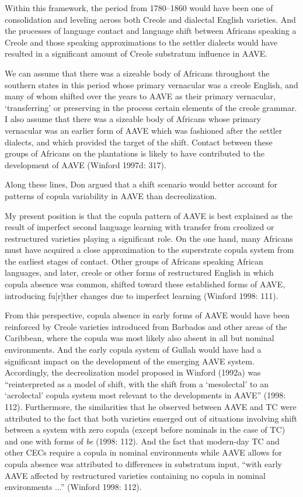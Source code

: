 \documentclass[output=paper, colorlinks,citecolor=brown]{langscibook}
\begin{document}
Within this framework, the period from 1780--1860 would have been one of consolidation and leveling across both Creole and dialectal English varieties. And the processes of language contact and language shift between Africans speaking a Creole and those speaking approximations to the settler dialects would have resulted in a significant amount of Creole substratum influence in AAVE. 

We can assume that there was a sizeable body of Africans throughout the southern states in this period whose primary vernacular was a creole English, and many of whom shifted over the years to AAVE as their primary vernacular, ‘transferring' or preserving in the process certain elements of the creole grammar. I also assume that there was a sizeable body of Africans whose primary vernacular was an earlier form of AAVE which was fashioned after the settler dialects, and which provided the target of the shift. Contact between these groups of Africans on the plantations is likely to have contributed to the development of AAVE (Winford 1997d: 317).

Along these lines, Don argued that a shift scenario would better account for patterns of copula variability in AAVE than decreolization.

My present position is that the copula pattern of AAVE is best explained as the result of imperfect second language learning with transfer from creolized or restructured varieties playing a significant role. On the one hand, many Africans must have acquired a close approximation to the superstrate copula system from the earliest stages of contact. Other groups of Africans speaking African languages, and later, creole or other forms of restructured English in which copula absence was common, shifted toward these established forms of AAVE, introducing fu[r]ther changes due to imperfect learning (Winford 1998: 111).

From this perspective, copula absence in early forms of AAVE would have been reinforced by Creole varieties introduced from Barbados and other areas of the Caribbean, where the copula was most likely also absent in all but nominal environments. And the early copula system of Gullah would have had a significant impact on the development of the emerging AAVE system. Accordingly, the decreolization model proposed in Winford (1992a) was “reinterpreted as a model of shift, with the shift from a ‘mesolectal’ to an ‘acrolectal' copula system most relevant to the developments in AAVE” (1998: 112). Furthermore, the similarities that he observed between AAVE and TC were attributed to the fact that both varieties emerged out of situations involving shift between a system with zero copula (except before nominals in the case of TC) and one with forms of \textit{be} (1998: 112). And the fact that modern-day TC and other CECs require a copula in nominal environments while AAVE allows for copula absence was attributed to differences in substratum input, “with early AAVE affected by restructured varieties containing no copula in nominal environments ...” (Winford 1998: 112).
\end{document}
